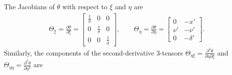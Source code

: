 \documentclass{article}
\begin{document}
The Jacobians of $\theta$ with respect to $\xi$ and $\eta$ are
%
\begin{align}
  \Theta_{\xi} = \frac{\partial \theta}{\partial \xi} =
  \begin{bmatrix}
    \frac{1}{\sigma} & 0                & 0                \\
    0                & \frac{s}{\sigma} & 0                \\
    0                & 0                & \frac{1}{\sigma}
  \end{bmatrix},
  \qquad
  \Theta_{\eta} = \frac{\partial \theta}{\partial \eta} =
  \begin{bmatrix}
    0    & -x'      \\
    \nu' & -\nu'    \\
    0    & -\delta'
  \end{bmatrix}.
\end{align}
%
Similarly, the components of the second-derivative 3-tensors
$\Theta_{\eta\xi} = \frac{\partial^2 \theta}{\partial \eta \partial \xi}$ and
$\Theta_{\eta\eta} = \frac{\partial^2 \theta}{\partial \eta^2}$
are
%
\end{document}
